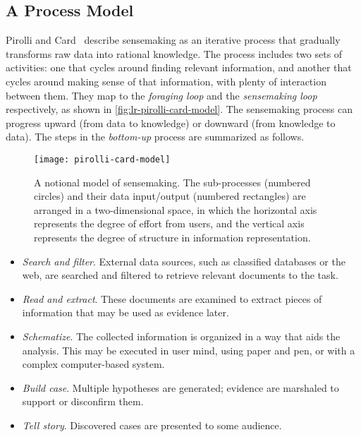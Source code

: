 
\subsection{A Process Model}
\label{sub:lr-pcm}
Pirolli and Card~\cite{Pirolli2005} describe sensemaking as an iterative process that gradually transforms raw data into rational knowledge. The process includes two sets of activities: one that cycles around finding relevant information, and another that cycles around making sense of that information, with plenty of interaction between them. They map to the \emph{foraging loop} and the \emph{sensemaking loop} respectively, as shown in \autoref{fig:lr-pirolli-card-model}. The sensemaking process can progress upward (from data to knowledge) or downward (from knowledge to data). The steps in the \emph{bottom-up} process are summarized as follows.

\begin{figure}[!htb]
	\centering
	\texttt{[image: pirolli-card-model]}
	\caption{A notional model of sensemaking. The sub-processes (numbered circles) and their data input/output (numbered rectangles) are arranged in a two-dimensional space, in which the horizontal axis represents the degree of effort from users, and the vertical axis represents the degree of structure in information representation. }
	\label{fig:lr-pirolli-card-model}
\end{figure}

\begin{itemize}
	\item \emph{Search and filter}. External data sources, such as classified databases or the web, are searched and filtered to retrieve relevant documents to the task.
	\item \emph{Read and extract}. These documents are examined to extract pieces of information that may be used as evidence later.
	\item \emph{Schematize}.  The collected information is organized in a way that aids the analysis. This may be executed in user mind, using paper and pen, or with a complex computer-based system.
	\item \emph{Build case}. Multiple hypotheses are generated; evidence are marshaled to support or disconfirm them.
	\item \emph{Tell story}. Discovered cases are presented to some audience.
\end{itemize}

